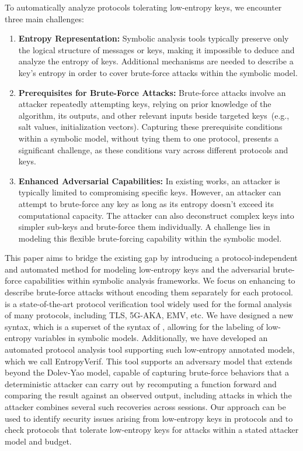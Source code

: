 To automatically analyze protocols tolerating low-entropy keys, we encounter three main challenges:
\begin{enumerate}[leftmargin=*]
    \item \textbf{Entropy Representation:}
    Symbolic analysis tools typically preserve only the logical structure of messages or keys, making it impossible to deduce and analyze the entropy of keys.
    Additional mechanisms are needed to describe a key's entropy in order to cover brute-force
    attacks within the symbolic model.
    \item \textbf{Prerequisites for Brute-Force Attacks:}
    Brute-force attacks involve an attacker repeatedly attempting keys, relying on prior knowledge of the algorithm, its outputs, and other relevant inputs beside targeted keys~(e.g., salt values, initialization vectors). 
    Capturing these prerequisite conditions within a symbolic model,
    without tying them to one protocol, presents a significant challenge,
    as these conditions vary across different protocols and keys.
    \item \textbf{Enhanced Adversarial Capabilities:}
    In existing works, an attacker is typically limited to compromising specific keys. 
    However, an attacker can attempt to brute-force any key as long as its entropy doesn't exceed its computational capacity. 
    The attacker can also deconstruct complex keys into simpler sub-keys and brute-force them individually. 
    A challenge lies in modeling this flexible brute-forcing capability within the symbolic model.
\end{enumerate}

This paper aims to bridge the existing gap by introducing a protocol-independent and automated
method for modeling low-entropy keys and the adversarial brute-force capabilities within symbolic
analysis frameworks.
We focus on enhancing \Tamarin{} to describe brute-force attacks without encoding them separately
for each protocol.
\Tamarin{} is a state-of-the-art protocol verification tool widely used for the formal analysis of many protocols, including TLS\cite{cremers2017tls13}, 5G-AKA\cite{basin20185G, wang20215G}, EMV\cite{basin2021emv,radu2022emv}, etc.
We have designed a new syntax, which is a superset of the syntax of \Tamarin{}, allowing for the labeling of low-entropy variables in symbolic models. 
Additionally, we have developed an automated protocol analysis tool supporting such low-entropy annotated models, which we call EntropyVerif\cite{toolrepo}. 
This tool supports an adversary model that extends beyond the Dolev-Yao model,
capable of capturing brute-force behaviors that a deterministic attacker can carry out by
recomputing a function forward and comparing the result against an observed output,
including attacks in which the attacker combines several such recoveries across sessions.
Our approach can be used to identify security issues arising from low-entropy keys in protocols
and to check protocols that tolerate low-entropy keys for attacks within a stated attacker model
and budget.

